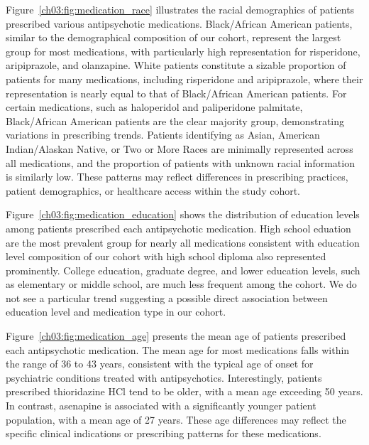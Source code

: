 Figure~\ref{ch03:fig:medication_race} illustrates the racial demographics of patients prescribed various antipsychotic medications.
Black/African American patients, similar to the demographical composition of our cohort, represent the largest group for most medications, with particularly high representation for risperidone, aripiprazole, and olanzapine.
White patients constitute a sizable proportion of patients for many medications, including risperidone and aripiprazole, where their representation is nearly equal to that of Black/African American patients.
For certain medications, such as haloperidol and paliperidone palmitate, Black/African American patients are the clear majority group, demonstrating variations in prescribing trends.
Patients identifying as Asian, American Indian/Alaskan Native, or Two or More Races are minimally represented across all medications, and the proportion of patients with unknown racial information is similarly low.
These patterns may reflect differences in prescribing practices, patient demographics, or healthcare access within the study cohort.

Figure~\ref{ch03:fig:medication_education} shows the distribution of education levels among patients prescribed each antipsychotic medication. 
High school eduation are the most prevalent group for nearly all medications consistent with education level composition of our cohort with high school diploma also represented prominently. 
College education, graduate degree, and lower education levels, such as elementary or middle school, are much less frequent among the cohort. 
We do not see a particular trend suggesting a possible direct association between education level and medication type in our cohort.

Figure~\ref{ch03:fig:medication_age} presents the mean age of patients prescribed each antipsychotic medication. 
The mean age for most medications falls within the range of 36 to 43 years, consistent with the typical age of onset for psychiatric conditions treated with antipsychotics. 
Interestingly, patients prescribed thioridazine HCl tend to be older, with a mean age exceeding 50 years. 
In contrast, asenapine is associated with a significantly younger patient population, with a mean age of 27 years. 
These age differences may reflect the specific clinical indications or prescribing patterns for these medications.

